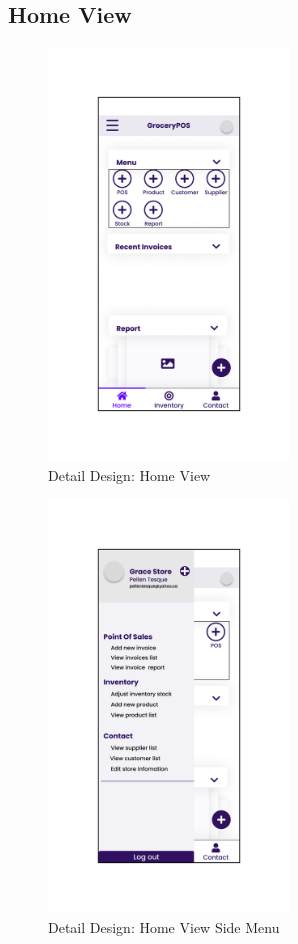 \documentclass[../thesis.tex]{subfiles}
\begin{document}
\subsection{Home View}

\begin{figure}[H]
    \centering
    \includegraphics[width=0.57\textwidth]{images/DetailedDesign_Home.png}
    \caption{Detail Design: Home View}
    \label{fig:DetailedDesign_Home}
\end{figure}


\begin{figure}[H]
    \centering
    \includegraphics[width=0.57\textwidth]{images/DetailedDesign_Home_Navigate.png}
    \caption{Detail Design: Home View Side Menu}
    \label{fig:DetailedDesign_Home_Navigate}
\end{figure}
\end{document}
